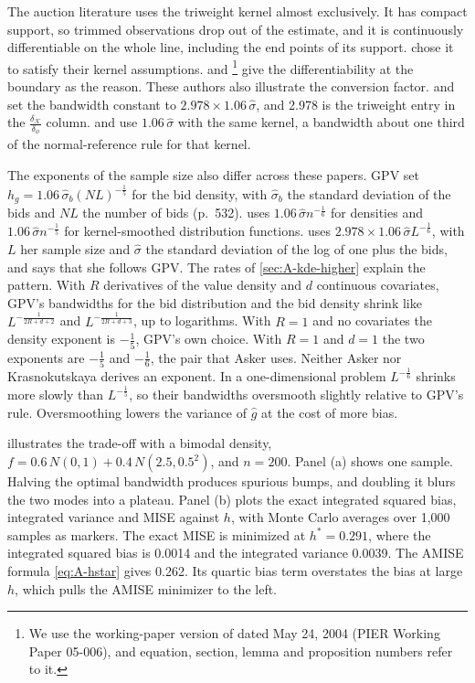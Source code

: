 The auction literature uses the triweight kernel almost exclusively. It has compact support, so
trimmed observations drop out of the estimate, and it is continuously differentiable on the whole line,
including the end points of its support. \citet[p.~532]{GuerrePerrigneVuong2000} chose it to satisfy
their kernel assumptions. \citet[p.~180]{LiPerrigneVuong2002} and \citet[Section~4.3]{Krasnokutskaya2011}\footnote{We use the
working-paper version of \citet{Krasnokutskaya2011} dated May 24, 2004 (PIER Working Paper 05-006), and equation,
section, lemma and proposition numbers refer to it.}
give the differentiability at the boundary as the reason. These authors also illustrate the conversion
factor. \citeauthor{LiPerrigneVuong2002} and \citeauthor{Krasnokutskaya2011} set the bandwidth constant
to $2.978\times1.06\,\hat\sigma$, and 2.978 is the triweight entry in the
$\frac{\delta_{\mathcal{K}}}{\delta_\phi}$ column. \citet[p.~532]{GuerrePerrigneVuong2000} and
\citet[p.~749]{Asker2010} use $1.06\,\hat\sigma$ with the same kernel, a bandwidth about one third of the
normal-reference rule for that kernel.

The exponents of the sample size also differ across these papers. GPV set $h_g=1.06\,\hat\sigma_b(NL)^{-\frac{1}{5}}$
for the bid density, with $\hat\sigma_b$ the standard deviation of the bids and $NL$ the number of bids (p.~532).
\citet[p.~749]{Asker2010} uses $1.06\,\hat\sigma n^{-\frac{1}{6}}$ for densities and $1.06\,\hat\sigma n^{-\frac{1}{5}}$
for kernel-smoothed distribution functions. \citet[Section~4.3]{Krasnokutskaya2011} uses
$2.978\times1.06\,\hat\sigma L^{-\frac{1}{6}}$, with $L$ her sample size and $\hat\sigma$ the standard deviation of
the log of one plus the bids, and says that she follows GPV. The rates of \cref{sec:A-kde-higher} explain the pattern. With $R$
derivatives of the value density and $d$ continuous covariates, GPV's bandwidths for the bid distribution and the bid
density shrink like $L^{-\frac{1}{2R+d+2}}$ and $L^{-\frac{1}{2R+d+3}}$, up to logarithms. With $R=1$ and no
covariates the density exponent is $-\frac{1}{5}$, GPV's own choice. With $R=1$ and $d=1$ the two exponents are
$-\frac{1}{5}$ and $-\frac{1}{6}$, the pair that Asker uses. Neither Asker nor Krasnokutskaya derives an exponent. In a
one-dimensional problem $L^{-\frac{1}{6}}$ shrinks more slowly than $L^{-\frac{1}{5}}$, so their bandwidths oversmooth
slightly relative to GPV's rule. Oversmoothing lowers the variance of $\hat g$ at the cost of more bias.

 illustrates the trade-off with a bimodal density,
$f=0.6\,N(0,1)+0.4\,N(2.5,0.5^2)$, and $n=200$. Panel (a) shows one sample. Halving the optimal
bandwidth produces spurious bumps, and doubling it blurs the two modes into a plateau. Panel (b) plots
the exact integrated squared bias, integrated variance and MISE against $h$, with Monte Carlo averages
over 1,000 samples as markers. The exact MISE is minimized at $h^*=0.291$, where the integrated
squared bias is 0.0014 and the integrated variance 0.0039. The AMISE formula \eqref{eq:A-hstar} gives
0.262. Its quartic bias term overstates the bias at large $h$, which pulls the AMISE minimizer to the
left.


